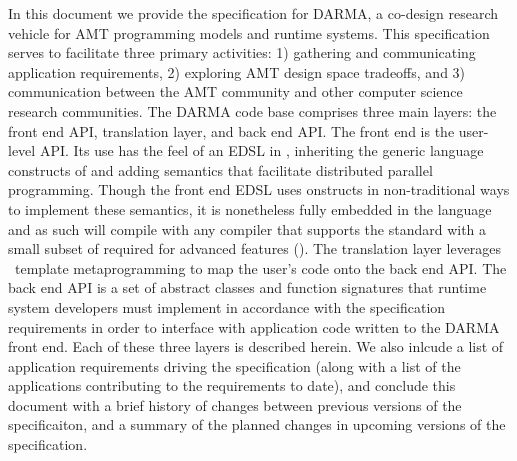 
In this document we provide the specification for DARMA,
a co-design research vehicle for \gls{AMT} programming models and runtime
systems.  This specification serves to facilitate three primary activities: 
1) gathering and communicating application requirements, 2) exploring AMT
design space tradeoffs, and 3) communication between the AMT community and
other computer science research communities.
The DARMA code base comprises three main layers: the \gls{front end} \gls{API},
\gls{translation layer}, and
\gls{back end} \gls{API}.  
The \gls{front end} is the user-level \gls{API}. 
Its use has the feel of an \gls{EDSL} in \CC,  inheriting the generic
language constructs of \CC and adding \gls{semantics} that facilitate
distributed parallel programming.  Though the \gls{front end} \gls{EDSL} uses
\CC onstructs in non-traditional ways to implement these semantics, it is
nonetheless fully embedded in the \CC language and as such will compile with any
\CC compiler that supports the  standard with a small subset of 
required for advanced features ().  
The \gls{translation layer} leverages \CC\ \gls{template
metaprogramming} to map the user's code onto the \gls{back end} \gls{API}.
The \gls{back end} \gls{API} is a set of abstract classes and function
signatures that runtime system developers must implement in accordance with the
specification requirements in order to interface with application code written
to the DARMA front end.  
Each of these three layers is described herein. We also
inlcude a list of application requirements driving the specification (along
with a list of the applications contributing to the requirements to date), and
conclude this document with a brief history of changes between previous
versions of the specificaiton, and a summary of the planned changes in upcoming
versions of the specification.

